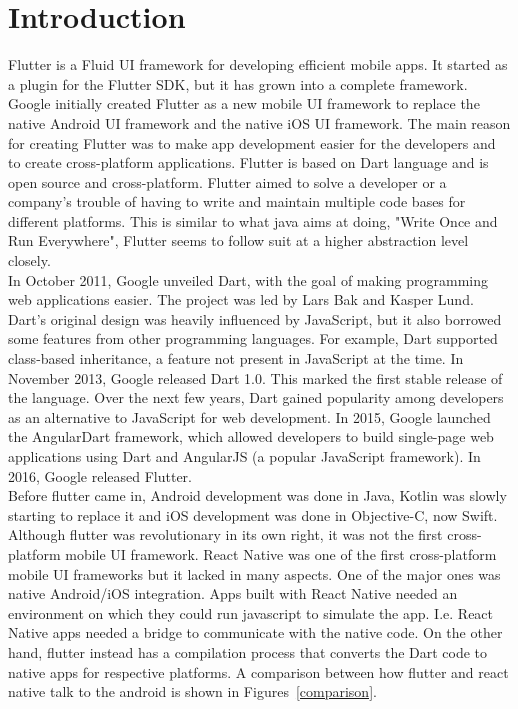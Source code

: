 \documentclass[conference, onecolumn]{IEEEtran}
\begin{document}
\section{Introduction}
Flutter is a Fluid UI framework for developing efficient mobile apps. It started as a plugin for the Flutter SDK, but it has grown into a complete framework. Google initially created Flutter as a new mobile UI framework to replace the native Android UI framework and the native iOS UI framework. The main reason for creating Flutter was to make app development easier for the developers and to create cross-platform applications. Flutter is based on Dart language and is open source and cross-platform. Flutter aimed to solve a developer or a company's trouble of having to write and maintain multiple code bases for different platforms. This is similar to what java aims at doing, "Write Once and Run Everywhere", Flutter seems to follow suit at a higher abstraction level closely. \\
In October 2011, Google unveiled Dart, with the goal of making programming web applications easier. The project was led by Lars Bak and Kasper Lund. Dart's original design was heavily influenced by JavaScript, but it also borrowed some features from other programming languages. For example, Dart supported class-based inheritance, a feature not present in JavaScript at the time. In November 2013, Google released Dart 1.0. This marked the first stable release of the language. Over the next few years, Dart gained popularity among developers as an alternative to JavaScript for web development. In 2015, Google launched the AngularDart framework, which allowed developers to build single-page web applications using Dart and AngularJS (a popular JavaScript framework). In 2016, Google released Flutter. \\ 
Before flutter came in, Android development was done in Java, Kotlin was slowly starting to replace it and iOS development was done in Objective-C, now Swift. Although flutter was revolutionary in its own right, it was not the first cross-platform mobile UI framework. React Native was one of the first cross-platform mobile UI frameworks but it lacked in many aspects. One of the major ones was native Android/iOS integration. Apps built with React Native needed an environment on which they could run javascript to simulate the app. I.e. React Native apps needed a bridge to communicate with the native code. On the other hand, flutter instead has a compilation process that converts the Dart code to native apps for respective platforms. A comparison between how flutter and react native talk to the android is shown in Figures~\ref{comparison}. \\
\end{document}

